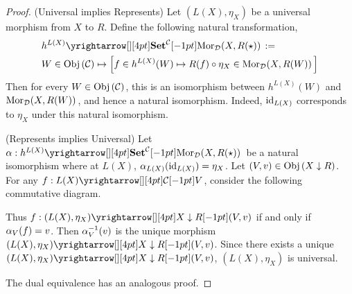 \begin{proof}
  (Universal implies Represents) 
  Let $(L(X),\eta_X)$ be a universal morphism from $X$ to $R$. 
  Define the following natural transformation,
  \begin{align*}
    &\map{h^{L(X)}}{\mor{X}{R(\star)}{\DD}}{\SET^\CC}{} := \\
    &W \in \obj{\CC} \mapsto \sqbrkt{
      f \in h^{L(X)}(W) \mapsto R(f) \circ \eta_X \in \mor{X}{R(W)}{\DD}
    }
  \end{align*}
  Then for every $W \in \mathrm{Obj}\left(\mathcal{C}\right)$, 
  this is an isomorphism between $h^{L(X)}(W)$ and $\mathrm{Mor}_{\mathcal{D}}(X, R(W))\,$,
  and hence a natural isomorphism. 
  Indeed, $\mathrm{id}_{L(X)}$ corresponds to $\eta_X$ under this natural isomorphism.

  (Represents implies Universal)
  Let $\al : \map{h^{L(X)}}{\mor{X}{R(\star)}{\DD}}{\SET^\CC}{}$
  be a natural isomorphism where at $L(X)$,
  $\alpha_{L(X)}(\mathrm{id}_{L(X)}) = \eta_X$.
  Let $(V,v) \in \mathrm{Obj}\left(X\downarrow R\right)$.
  For any $f : \map{L(X)}{V}{\CC}{}$,
  consider the following commutative diagram. 
  \begin{figure}[H]
    \centering
  \end{figure}
  Thus $f : \map{(L(X),\eta_X)}{(V,v)}{X\darrow R}{}$
  if and only if $\alpha_V(f) = v$.
  Then $\alpha_V^{-1}(v)$ is 
  the unique morphism $\map{(L(X),\eta_X)}{(V,v)}{X\darrow R}{}$.
  Since there exists a unique $\map{(L(X),\eta_X)}{(V,v)}{X\darrow R}{}$,
  $(L(X),\eta_X)$ is universal.

  The dual equivalence has an analogous proof.
\end{proof}


